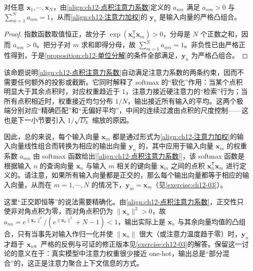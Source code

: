 \documentclass[../../main.tex]{subfiles}
\begin{document}
\begin{proposition}\label{proposition:ch12-softmax归一}
对任意 $\mathbf{x}_1,\cdots,\mathbf{x}_N$，由\eqref{align:ch12-点积注意力系数}定义的 $a_{nm}$ 满足 $a_{nm}>0$ 与 $\sum_{m=1}^{N}a_{nm}=1$，从而\eqref{align:ch12-注意力加权}的 $\mathbf{y}_n$ 是输入向量的严格凸组合。
\end{proposition}

\begin{proof}
指数函数取值恒正，故分子 $\exp(\mathbf{x}_n^{\mathsf{T}}\mathbf{x}_m)>0$，分母是 $N$ 个正数之和，因而 $a_{nm}>0$。把分子对 $m$ 求和即得分母，故 $\sum_{m=1}^{N}a_{nm}=1$。非负性已由严格正性得到，于是\cref{proposition:ch12-单位分解}的条件全部满足，$\mathbf{y}_n$ 为严格凸组合。
\end{proof}

\begin{remark}
该命题说明\eqref{align:ch12-点积注意力系数}自动满足注意力系数的两条约束，因而不需要任何额外的投影或截断。它同时解释了 softmax 的“软化”作用：当某个点积明显大于其余点积时，对应权重趋近于 $1$，注意力接近硬注意力的“检索”行为；当所有点积相近时，权重接近均匀分布 $1/N$，输出接近所有输入的平均。这两个极端分别对应“精确匹配”和“无偏好平均”，中间的连续过渡由点积的尺度控制——这也是下一小节要引入 $1/\sqrt{D_k}$ 缩放的原因。
\end{remark}

因此，总的来说，每个输入向量 $\mathbf{x}_m$ 都是通过形式为\eqref{align:ch12-注意力加权}的输入向量线性组合而转换为相应的输出向量 $\mathbf{y}_n$ 的，其中应用于输入向量 $\mathbf{x}_m$ 的权重系数 $a_{nm}$ 由 softmax 函数给出[\eqref{align:ch12-点积注意力系数}]，该 softmax 函数是根据输入 $n$ 的查询向量 $\mathbf{x}_n$ 与输入 $m$ 相关的键向量 $\mathbf{x}_m$ 之间的点积 $\mathbf{x}_n^{\mathsf{T}}\mathbf{x}_m$ 进行定义的。请注意，如果所有输入向量都是正交的，那么每个输出向量都等于相应的输入向量，从而在 $m=1,\cdots,N$ 的情况下，$\mathbf{y}_m=\mathbf{x}_m$（见\cref{exercise:ch12-03}）。

\begin{remark}
这里“正交即恒等”的说法需要精确化。由\eqref{align:ch12-点积注意力系数}，正交性只使非对角点积为零，而对角点积仍为 $\|\mathbf{x}_n\|^{2}>0$，故 $a_{nn}=e^{\|\mathbf{x}_n\|^{2}}\big/\left(e^{\|\mathbf{x}_n\|^{2}}+N-1\right)<1$，输出实际上是 $\mathbf{x}_n$ 与其余向量均值的凸组合，只有当事先对输入作归一化并使 $\|\mathbf{x}_n\|$ 很大（或注意力温度趋于零）时，$\mathbf{y}_n$ 才趋于 $\mathbf{x}_n$。严格的反例与可证的修正版本见\cref{exercise:ch12-03}的解答。保留这一讨论的意义在于：真实模型中注意力权重很少接近 one-hot，输出总是“部分混合”的，这正是注意力聚合上下文信息的方式。
\end{remark}
\end{document}
